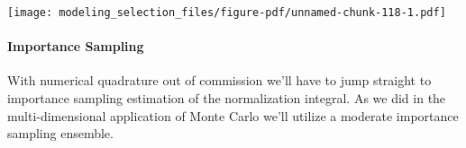 \documentclass[
  letterpaper,
  DIV=11,
  numbers=noendperiod]{scrartcl}
\let\oldparagraph\paragraph
\renewcommand{\paragraph}[1]{\oldparagraph{#1}\mbox{}}
\newenvironment{Shaded}{\begin{snugshade}}{\end{snugshade}}
\newcommand{\AttributeTok}[1]{\textcolor[rgb]{0.40,0.45,0.13}{#1}}
\newcommand{\DecValTok}[1]{\textcolor[rgb]{0.68,0.00,0.00}{#1}}
\newcommand{\FloatTok}[1]{\textcolor[rgb]{0.68,0.00,0.00}{#1}}
\newcommand{\FunctionTok}[1]{\textcolor[rgb]{0.28,0.35,0.67}{#1}}
\newcommand{\NormalTok}[1]{\textcolor[rgb]{0.00,0.23,0.31}{#1}}
\newcommand{\SpecialCharTok}[1]{\textcolor[rgb]{0.37,0.37,0.37}{#1}}
\newcommand{\StringTok}[1]{\textcolor[rgb]{0.13,0.47,0.30}{#1}}
\begin{document}
\begin{Shaded}
\end{Shaded}

\texttt{[image: modeling\_selection\_files/figure-pdf/unnamed-chunk-118-1.pdf]}

\paragraph{Importance Sampling}\label{importance-sampling-1}

With numerical quadrature out of commission we'll have to jump straight
to importance sampling estimation of the normalization integral. As we
did in the multi-dimensional application of Monte Carlo we'll utilize a
moderate importance sampling ensemble.
\end{document}
